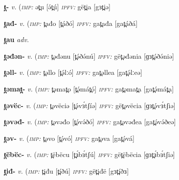 \newentry
\headword\textbf{t̪-}  
\ipa{[t̪-]}
\synpos\textit{v.} 
\imperative(\textit {\textsc{imp:}} ət̪u [ə́t̪ú]	
\imperfective\textit{\textsc{ipfv:}} gët̪ia [gɜt̪iə] 

\newentry
\headword\textbf{t̪ađ-}  
\ipa{[t̪áð-]}
\synpos\textit{v.} 
\imperative(\textit {\textsc{imp:}} t̪ađo [t̪áðó]	
\imperfective\textit{\textsc{ipfv:}} gat̪ađa [gat̪áðá] 

\newentry
\headword\textbf{t̪au}  
\ipa{[t̪áu]}
\synpos\textit{adv.} 

\newentry
\headword\textbf{t̪əđən-}  
\ipa{[t̪ɘ́ðɘ́n-]}
\synpos\textit{v.} 
\imperative(\textit {\textsc{imp:}} t̪əđənu [t̪ə́ðə́nú]	
\imperfective\textit{\textsc{ipfv:}} gët̪əđənia [ɡɜt̪ə́ðə́niə]

\newentry
\headword\textbf{t̪əll-}  
\ipa{[t̪ə́lː-]}
\synpos\textit{v.} 
\imperative(\textit {\textsc{imp:}} t̪əllo [t̪ə́lːó]	
\imperfective\textit{\textsc{ipfv:}} gat̪əllea [gat̪ə́lːeə] 

\newentry
\headword\textbf{t̪əmat̪-}  
\ipa{[t̪ə́mát̪-]}
\synpos\textit{v.} 
\imperative(\textit {\textsc{imp:}} t̪əmat̪o [t̪ə́mát̪ó]	
\imperfective\textit{\textsc{ipfv:}} gat̪əmat̪a [gat̪ə́mát̪a]

\newentry
\headword\textbf{t̪əvëc-}  
\ipa{[t̪ə́vɜ́tʃ-]}
\synpos\textit{v.} 
\imperative(\textit {\textsc{imp:}} t̪əvëciə [t̪ə́vɜ́tʃíə] %
\imperfective\textit{\textsc{ipfv:}} gët̪əvëcia [ɡɜt̪ə́vɜ́tʃiə]

\newentry
\headword\textbf{t̪əvəđ-}  
\ipa{[t̪ə́və́ð-]}
\synpos\textit{v.} 
\imperative(\textit {\textsc{imp:}} t̪əvəđo [t̪ə́və́ðó]	
\imperfective\textit{\textsc{ipfv:}} gat̪əvəđea [gat̪ə́və́ðeə]

\newentry
\headword\textbf{t̪əv-}  
\ipa{[t̪ə́v-]}
\synpos\textit{v.} 
\imperative(\textit {\textsc{imp:}} t̪əvo [t̪ə́vó]	
\imperfective\textit{\textsc{ipfv:}} gat̪əva [gat̪ə́vá]

\newentry
\headword\textbf{t̪ëbëc-}  
\ipa{[t̪ɜ́bɜ́tʃ-]}
\synpos\textit{v.} 
\imperative(\textit {\textsc{imp:}} t̪ëbëcu [t̪ɜ́bɜ́tʃú] %
\imperfective\textit{\textsc{ipfv:}} gët̪ëbëcia [ɡɜt̪ɜ́bɜ́tʃiə]

\newentry
\headword\textbf{t̪iđ-}  
\ipa{[t̪íð-]}
\synpos\textit{v.} 
\imperative(\textit {\textsc{imp:}} t̪iđu [t̪íðú]  
\imperfective\textit{\textsc{ipfv:}} gët̪iđë [gɜt̪íðɜ]

